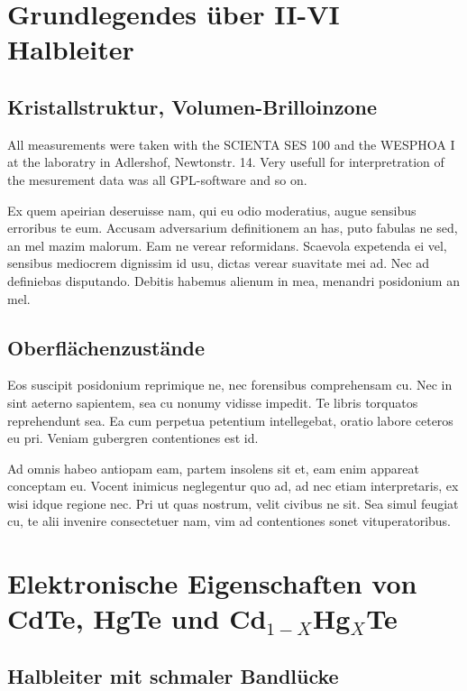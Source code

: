\documentclass[11pt,twoside,german]{book}
\begin{document}
\chapter{Grundlegendes über II-VI Halbleiter}

\section{Kristallstruktur, Volumen-Brilloinzone}

All measurements were taken with the SCIENTA SES 100 and the WESPHOA
I at the laboratry in Adlershof, Newtonstr. 14. Very usefull for interpretration
of the mesurement data was all GPL-software and so on.

Ex quem apeirian deseruisse nam, qui eu odio moderatius, augue sensibus erroribus te eum. Accusam adversarium definitionem an has, puto fabulas ne sed, an mel mazim malorum. Eam ne verear reformidans. Scaevola expetenda ei vel, sensibus mediocrem dignissim id usu, dictas verear suavitate mei ad. Nec ad definiebas disputando. Debitis habemus alienum in mea, menandri posidonium an mel.

\section{Oberflächenzustände}

Eos suscipit posidonium reprimique ne, nec forensibus comprehensam cu. Nec in sint aeterno sapientem, sea cu nonumy vidisse impedit. Te libris torquatos reprehendunt sea. Ea cum perpetua petentium intellegebat, oratio labore ceteros eu pri. Veniam gubergren contentiones est id.

Ad omnis habeo antiopam eam, partem insolens sit et, eam enim appareat conceptam eu. Vocent inimicus neglegentur quo ad, ad nec etiam interpretaris, ex wisi idque regione nec. Pri ut quas nostrum, velit civibus ne sit. Sea simul feugiat cu, te alii invenire consectetuer nam, vim ad contentiones sonet vituperatoribus.

\chapter{Elektronische Eigenschaften von CdTe, HgTe und Cd$_{1-X}$Hg$_{X}$Te}
\section{Halbleiter mit schmaler Bandlücke}
\end{document}
